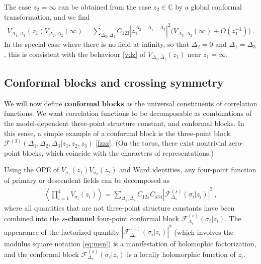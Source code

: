 \documentclass[12pt, a4paper, notitlepage, twoside]{report}
\numberwithin{equation}{section}
\theoremstyle{break}
\begin{document}
The case $z_2=\infty$ can be obtained from the case $z_2\in\mathbb{C}$ by a global conformal transformation, and we find 
\begin{align}
 V_{\Delta_1,\bar\Delta_1}(z_1) V_{\Delta_2,\bar\Delta_2}(\infty) =  \sum_{\Delta_3,\bar\Delta_3}C_{123}\left| z_1^{\Delta_2-\Delta_1-\Delta_3}\right|^2 \Big( V_{\Delta_3,\bar\Delta_3}(\infty) + O\left(z_1^{-1}\right)\Big) \ .
 \label{iope}
\end{align}
In the special case where there is no field at infinity, so that $\Delta_2=0$ and $\Delta_1=\Delta_3$, this is consistent with the behaviour \eqref{vdz} of $V_{\Delta_1,\bar\Delta_1}(z_1)$ near $z_1=\infty$.

\subsection{Conformal blocks and crossing symmetry \label{secaco}}

We will now define \textbf{\boldmath conformal blocks} as the universal constituents of correlation functions. 
We want correlation functions to be decomposable as combinations of the model-dependent three-point structure constant, and conformal blocks.
In this sense, a simple example of a conformal block is the three-point block $\mathcal{F}^{(3)}(\Delta_1,\Delta_2,\Delta_3|z_1,z_2,z_3)$ \eqref{fzzz}. (On the torus, there exist nontrivial zero-point blocks, which coincide with the characters of representations.)

Using the OPE of $V_{\sigma_1}(z_1)V_{\sigma_2}(z_2)$ and Ward identities, any four-point function of primary or descendent fields can be decomposed as 
\begin{align}
 \left\langle \prod_{i=1}^4 V_{\sigma_i}(z_i)\right\rangle 
 = \sum_{\Delta_s,\bar{\Delta}_s} C_{12s} C_{s34} \left| \mathcal{F}^{(s)}_{\Delta_s}(\sigma_i|z_i)\right|^2\ ,
\label{fsd}
\end{align}
where all quantities that are not three-point structure constants have been combined into the \textbf{\boldmath $s$-channel} four-point conformal block $\mathcal{F}^{(s)}_{\Delta_s}(\sigma_i|z_i)$.
The appearance of the factorized quantity $\left| \mathcal{F}^{(s)}_{\Delta_s}(\sigma_i|z_i)\right|^2$ (which involves the modulus square notation \eqref{eq:msn}) is a manifestation of holomophic factorization, and the conformal block $\mathcal{F}^{(s)}_{\Delta_s}(\sigma_i|z_i)$ is a locally holomorphic function of $z_i$. 
\end{document}

